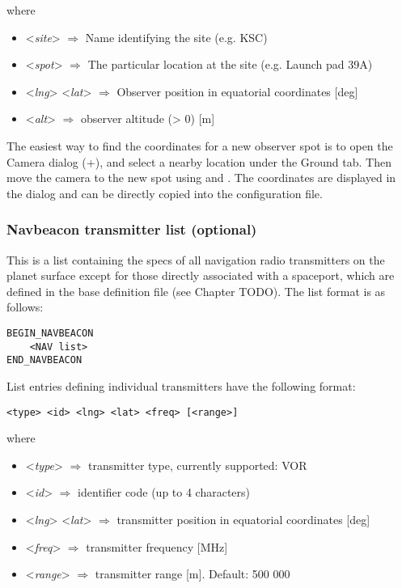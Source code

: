 \documentclass[Orbiter Developer Manual.tex]{subfiles}
\begin{document}
\noindent
where

\begin{itemize}
\item <\textit{site}> $\Rightarrow$ Name identifying the site (e.g. KSC)
\item <\textit{spot}> $\Rightarrow$ The particular location at the site (e.g. Launch pad 39A)
\item <\textit{lng}> <\textit{lat}> $\Rightarrow$ Observer position in equatorial coordinates [deg]
\item <\textit{alt}> $\Rightarrow$ observer altitude (> 0) [m]
\end{itemize}

\noindent
The easiest way to find the coordinates for a new observer spot is to open the Camera dialog (\Ctrl+), and select a nearby location under the Ground tab. Then move the camera to the new spot using \Ctrl\DArrow\UArrow\RArrow\LArrow and . The coordinates are displayed in the dialog and can be directly copied into the configuration file.


\subsubsection*{Navbeacon transmitter list (optional)}
This is a list containing the specs of all navigation radio transmitters on the planet surface except for those directly associated with a spaceport, which are defined in the base definition file (see Chapter TODO). The list format is as follows:

\begin{lstlisting}[language=OSFS]
BEGIN_NAVBEACON
	<NAV list>
END_NAVBEACON
\end{lstlisting}

\noindent
List entries defining individual transmitters have the following format:

\begin{lstlisting}[language=OSFS]
<type> <id> <lng> <lat> <freq> [<range>]
\end{lstlisting}

\noindent
where

\begin{itemize}
\item <\textit{type}> $\Rightarrow$ transmitter type, currently supported: VOR
\item <\textit{id}> $\Rightarrow$ identifier code (up to 4 characters)
\item <\textit{lng}> <\textit{lat}> $\Rightarrow$ transmitter position in equatorial coordinates [deg]
\item <\textit{freq}> $\Rightarrow$ transmitter frequency [MHz]
\item <\textit{range}> $\Rightarrow$ transmitter range [m]. Default: 500 000
\end{itemize}
\end{document}

